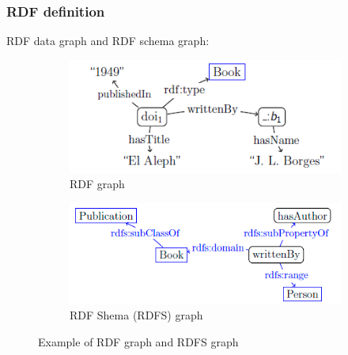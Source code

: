 \documentclass{beamer}
\numberwithin{figure}{section}
\numberwithin{equation}{section}
\begin{document}
\section{}
\begin{frame}
 \frametitle{RDF definition}
 	RDF data graph and RDF schema graph:
 	\begin{figure}[h]
        \begin{subfigure}[h]{0.45\linewidth} 
            \includegraphics[width=\textwidth]{pictures/rdf_graph}
            \caption{\scriptsize RDF graph}
            \label{fig:rdf_graph}
        \end{subfigure}       
        \begin{subfigure}[h]{0.45\linewidth} 
            \includegraphics[width=\linewidth]{pictures/rdfs_graph}
            \caption{\scriptsize RDF Shema (RDFS) graph}
            \label{fig:rdfs_graph}
        \end{subfigure}
        \caption{\scriptsize Example of RDF graph and RDFS graph}
    \end{figure}
    
\end{frame}

\end{document}
